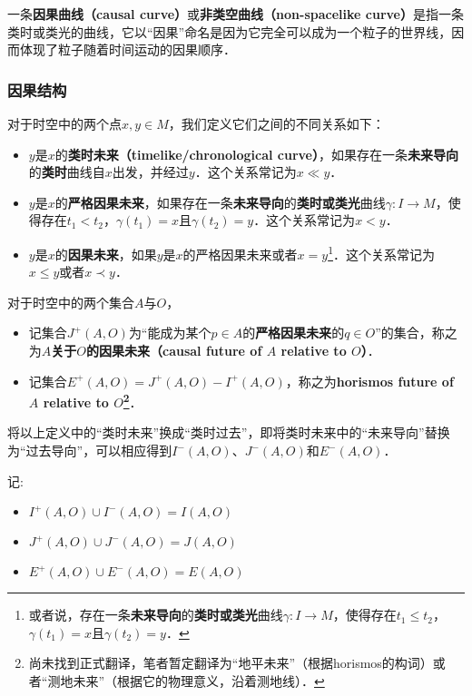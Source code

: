 一条\textbf{因果曲线（causal curve）}或\textbf{非类空曲线（non-spacelike curve）}是指一条类时或类光的曲线，它以“因果”命名是因为它完全可以成为一个粒子的世界线，因而体现了粒子随着时间运动的因果顺序．


\subsubsection{因果结构}

对于时空中的两个点$x, y\in M$，我们定义它们之间的不同关系如下：

\begin{itemize}
\item $y$是$x$的\textbf{类时未来（timelike/chronological curve）}，如果存在一条\textbf{未来导向}的\textbf{类时}曲线自$x$出发，并经过$y$．这个关系常记为$x\ll y$．
\item $y$是$x$的\textbf{严格因果未来}，如果存在一条\textbf{未来导向}的\textbf{类时或类光}曲线$\gamma:I\rightarrow M$，使得存在$t_1<t_2$，$\gamma(t_1)=x$且$\gamma(t_2)=y$．这个关系常记为$x< y$．
\item $y$是$x$的\textbf{因果未来}，如果$y$是$x$的严格因果未来或者$x=y$\footnote{或者说，存在一条\textbf{未来导向}的\textbf{类时或类光}曲线$\gamma:I\rightarrow M$，使得存在$t_1\leq t_2$，$\gamma(t_1)=x$且$\gamma(t_2)=y$．}．这个关系常记为$x\leq y$或者$x\prec y$．
\end{itemize}

对于时空中的两个集合$A$与$O$，


\begin{itemize}
$I^+(A, O)$为“能成为某个$p\in A$的\textbf{类时未来}的$q\in O$”的集合，称之为\textbf{$A$关于$O$的类时未来（choronological future of $A$ relative to $O$）}．
\item 记集合$J^+(A, O)$为“能成为某个$p\in A$的\textbf{严格因果未来}的$q\in O$”的集合，称之为\textbf{$A$关于$O$的因果未来（causal future of $A$ relative to $O$）}．
\item 记集合$E^+(A, O)=J^+(A, O)-I^+(A, O)$，称之为\textbf{horismos future of $A$ relative to $O$\footnote{尚未找到正式翻译，笔者暂定翻译为“地平未来”（根据horismos的构词）或者“测地未来”（根据它的物理意义，沿着测地线）．}}．
\end{itemize}

将以上定义中的“类时未来”换成“类时过去”，即将类时未来中的“未来导向”替换为“过去导向”，可以相应得到$I^-(A, O)$、$J^-(A, O)$和$E^-(A, O)$．

记:
\begin{itemize}
\item $I^+(A, O)\cup I^-(A, O)=I(A,O)$
\item $J^+(A, O)\cup J^-(A, O)=J(A,O)$
\item $E^+(A, O)\cup E^-(A, O)=E(A,O)$
\end{itemize}








